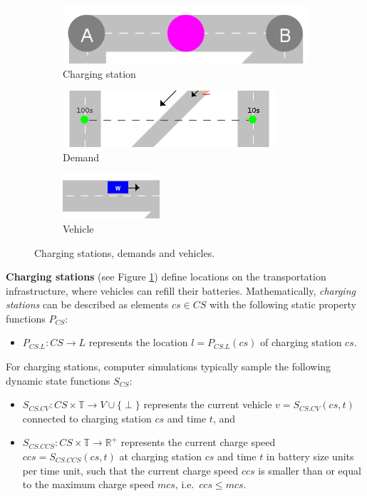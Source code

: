 \documentclass[graybox]{svmult}
\begin{document}
\begin{figure}[htbp]
	\centering
	\begin{subfigure}{.35\textwidth}
		\centering
		\includegraphics[scale=0.3]{./graphics/concepts/charge-station.png}
		\caption{Charging station}
		\label{fig:charging-station}	
	\end{subfigure}
	\begin{subfigure}{.35\textwidth}
		\centering
		\includegraphics[scale=0.5]{./graphics/concepts/demand.png}
		\caption{Demand}
		\label{fig:demand}
	\end{subfigure}
	\begin{subfigure}{.2\textwidth}
		\centering
		\includegraphics[scale=0.5]{./graphics/concepts/vehicle.png}
		\caption{Vehicle}
		\label{fig:vehicle}	
	\end{subfigure}
	\caption{Charging stations, demands and vehicles.}
	\label{fig:chargingstations-demands-vehicles}	
\end{figure}

\noindent \textbf{Charging stations} (see Figure \ref{fig:charging-station}) define locations on the transportation infrastructure, where vehicles can refill their batteries.
Mathematically, \textit{charging stations} can be described as elements $cs \in CS$ with the following static property functions $P_{CS}$:
\begin{itemize}
	\item $P_{CS.L}: CS \rightarrow L$ represents the location $l = P_{CS.L}(cs)$ of charging station $cs$.
\end{itemize}
For charging stations, computer simulations typically sample the following dynamic state functions $S_{CS}$:
\begin{itemize}
	\item $S_{CS.CV}: CS \times \mathbb{T} \rightarrow V \cup \{\perp\}$ represents the current vehicle $v = S_{CS.CV}(cs, t)$ connected to charging station $cs$ and time $t$, and
	\item $S_{CS.CCS}: CS \times \mathbb{T} \rightarrow \mathbb{R}^+$ represents the current charge speed $ccs = S_{CS.CCS}(cs, t)$ at charging station $cs$ and time $t$ in battery size units per time unit, such that the current charge speed $ccs$ is smaller than or equal to the maximum charge speed $mcs$, i.e.\ $ccs \leq mcs$.
\end{itemize}
\end{document}
